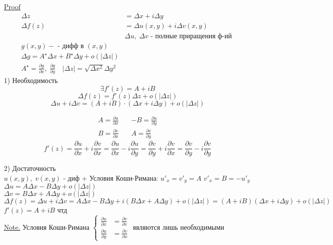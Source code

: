 \documentclass[12pt]{article}
\begin{document}
\underline{Proof} \\
\begin{equation*}
    \begin{aligned}
        \Delta z &= \Delta x + i \Delta y\\
        \Delta f(z) &= \Delta u(x,y) + i \Delta v(x,y) \\
                &\Delta u, \; \Delta v \text{ - полные приращения ф-ий } \\
                g(x,y) - \text{ - дифф  в } (x,y) \\
                \Delta g = A^\star \Delta x + B^\star \Delta y + o(|\Delta z|)\\
                A^\star = \frac{\partial g}{\partial x} , \; \frac{\partial g}
                {\partial y} \quad |\Delta z| = \sqrt{\Delta x^2}{\Delta y^2} 
    \end{aligned}
\end{equation*}
1) Необходимость \\
\[
    \exists f'(z) = A + iB
\]
\[
    \Delta f(z) = f'(z) \Delta z + o(|\Delta z|)
\]
\[
    \Delta u + i \Delta v = (A + iB)\cdot(\Delta x + i \Delta y) + o(|\Delta z|)
\]

\[
\begin{aligned}
    A = \frac{\partial u}{\partial x} \quad& -B = \frac{\partial u}{\partial y} \\
    B = \frac{\partial v}{\partial x} \quad& A = \frac{\partial v}{\partial y}  
\end{aligned}
\]
\[
    f'(z) = \frac{\partial u}{\partial x} + i \frac{\partial v}{\partial x} =
    \frac{\partial u}{\partial x} - i \frac{\partial u}{\partial y} =
    \frac{\partial v}{\partial y} + i \frac{\partial v}{\partial x} =
    \frac{\partial v}{\partial y} - i \frac{\partial v}{\partial y} 
\]

2) Достаточность \\
$ u(x,y), \; v(x,y) $ - диф + Условия Коши-Римана: $u'_x = v'_y = A$ 
$ v'_x = B = -u'_y $\\
$ \Delta u = A \Delta x - B \Delta y + o(|\Delta z|) $ \\
$ \Delta v = B \Delta x + A \Delta y + o(|\Delta z|) $ \\
$ \Delta f(z) = \Delta u + i \Delta v = A \Delta x - B \Delta y + i(B \Delta x + 
A \Delta y) + o(|\Delta z|) = (A + iB)(\Delta x + i \Delta y) + o(|\Delta z|)$ \\
$ f'(z) = A + iB$ чтд\\

\underline{Note.} Условия Коши-Римана  
$
\begin{cases}
    \frac{\partial u}{\partial x} &= \frac{\partial v}{\partial v} \\ 
    \frac{\partial u}{\partial y} &= \frac{\partial v}{\partial x}  
\end{cases}
$
 являются лишь необходимыми
\end{document}
